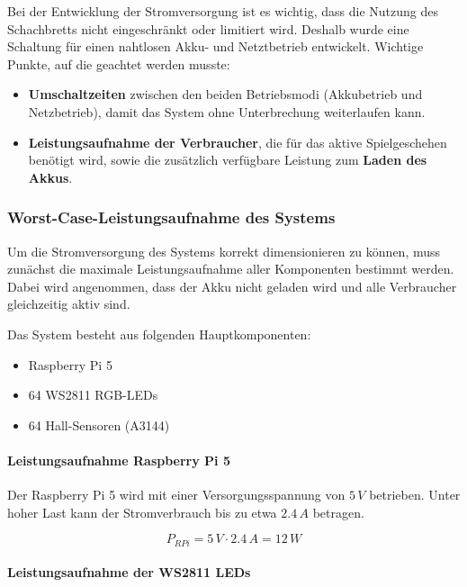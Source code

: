 Bei der Entwicklung der Stromversorgung ist es wichtig, dass die Nutzung des Schachbretts nicht eingeschränkt oder limitiert wird. Deshalb wurde eine Schaltung für einen nahtlosen Akku- und Netztbetrieb entwickelt. Wichtige Punkte, auf die geachtet werden musste:

\begin{itemize}
    \item \textbf{Umschaltzeiten} zwischen den beiden Betriebsmodi (Akkubetrieb und Netzbetrieb), damit das System ohne Unterbrechung weiterlaufen kann.
    \item \textbf{Leistungsaufnahme der Verbraucher}, die für das aktive Spielgeschehen benötigt wird, sowie die zusätzlich verfügbare Leistung zum \textbf{Laden des Akkus}.
\end{itemize}


\subsubsection{Worst-Case-Leistungsaufnahme des Systems}

Um die Stromversorgung des Systems korrekt dimensionieren zu können, muss zunächst die maximale Leistungsaufnahme aller Komponenten bestimmt werden. Dabei wird angenommen, dass der Akku nicht geladen wird und alle Verbraucher gleichzeitig aktiv sind.

Das System besteht aus folgenden Hauptkomponenten:

\begin{itemize}
    \item Raspberry Pi 5
    \item 64 WS2811 RGB-LEDs
    \item 64 Hall-Sensoren (A3144)
\end{itemize}

\paragraph{Leistungsaufnahme Raspberry Pi 5}

Der Raspberry Pi 5 wird mit einer Versorgungsspannung von $5\,V$ betrieben. Unter hoher Last kann der Stromverbrauch bis zu etwa $2.4\,A$ betragen.

\[
P_{RPi} = 5\,V \cdot 2.4\,A = 12\,W
\]

\paragraph{Leistungsaufnahme der WS2811 LEDs}

